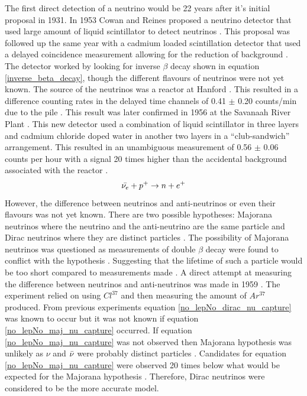 \documentclass[12pt,a4paper]{article}
\begin{document}
The first direct detection of a neutrino would be 22 years after it's initial proposal in 1931. In 1953 Cowan and Reines proposed a neutrino detector that used large amount of liquid scintillator to detect neutrinos \cite{reines1953proposed}. This proposal was followed up the same year with a cadmium loaded scintillation detector that used a delayed coincidence measurement allowing for the reduction of background \cite{reines1953proposed} \cite{reines1953detection}. The detector worked by looking for inverse $\beta$ decay shown in equation \ref{inverse_beta_decay}, though the different flavours of neutrinos were not yet known. The source of the neutrinos was a reactor at Hanford \cite{reines1953detection}. This resulted in a difference counting rates in the delayed time channels of 0.41 $\pm$ 0.20 counts/min due to the pile \cite{reines1953detection}. This result was later confirmed in 1956 at the Savanaah River Plant \cite{Cowan1956Confirmation}. This new detector used a combination of liquid scintillator in three layers and cadmium chloride doped water in another two layers in a ``club-sandwich'' arrangement. This resulted in an unambiguous measurement of 0.56 $\pm$ 0.06 counts per hour with a signal 20 times higher than the accidental background associated with the reactor \cite{Cowan1956Confirmation}. 
\begin{equation}
    \Bar{\nu_e} + p^+ \rightarrow n + e^+
    \label{inverse_beta_decay}
\end{equation}
However, the difference between neutrinos and anti-neutrinos or even their flavours was not yet known. There are two possible hypotheses: Majorana neutrinos where the neutrino and the anti-neutrino are the same particle and Dirac neutrinos where they are distinct particles \cite{griffiths2008book} \cite{griffiths2008neutrino1.5} \cite{cowan1957test}. The possibility of Majorana neutrinos was questioned as measurements of double $\beta$ decay were found to conflict with the hypothesis \cite{cowan1957test}. Suggesting that the lifetime of such a particle would be too short compared to measurements made \cite{cowan1957test}. A direct attempt at measuring the difference between neutrinos and anti-neutrinos was made in 1959 \cite{davis1959attempt}. The experiment relied on using $Cl^{37}$ and then measuring the amount of $Ar^{37}$ produced. From previous experiments \cite{Cowan1956Confirmation} equation \ref{no_lepNo_dirac_nu_capture} was known to occur but it was not known if equation \ref{no_lepNo_maj_nu_capture} occurred. If equation \ref{no_lepNo_maj_nu_capture} was not observed then Majorana hypothesis was unlikely as $\nu$ and $\Bar{\nu}$ were probably distinct particles \cite{griffiths2008book} \cite{griffiths2008neutrino1.5} \cite{davis1959attempt}. Candidates for equation \ref{no_lepNo_maj_nu_capture} were observed 20 times below what would be expected for the Majorana hypothesis \cite{davis1959attempt}. Therefore, Dirac neutrinos were considered to be the more accurate model. 
\end{document}
